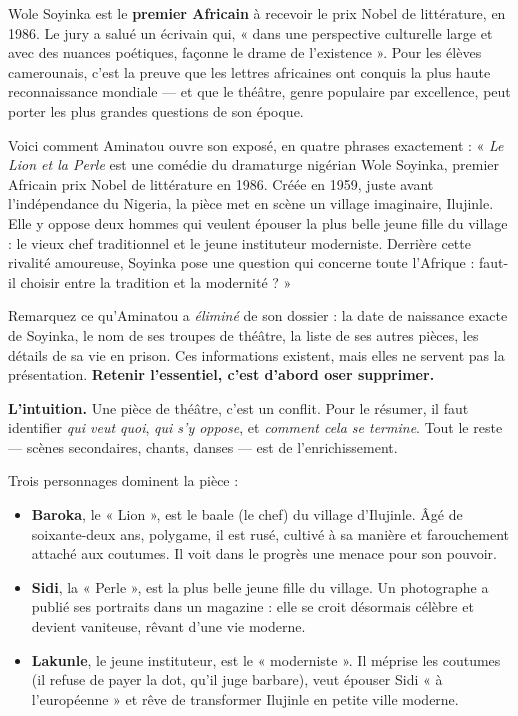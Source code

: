 \documentclass[11pt]{article}
\newcounter{popsec}
\newcounter{popsub}
\newcommand{\courssub}[1]{%
  \stepcounter{popsub}%
  \par\vspace{9pt}\noindent{\popxbold\fontsize{11.5}{13}\selectfont\color{popink}{\color{poporange}\thepopsec.\thepopsub}\hspace{6pt}#1}\par\nopagebreak\vspace{4pt}
}
\begin{document}
\begin{savaistu}
Wole Soyinka est le \textbf{premier Africain} à recevoir le prix Nobel de littérature, en 1986. Le jury a salué un écrivain qui, « dans une perspective culturelle large et avec des nuances poétiques, façonne le drame de l'existence ». Pour les élèves camerounais, c'est la preuve que les lettres africaines ont conquis la plus haute reconnaissance mondiale — et que le théâtre, genre populaire par excellence, peut porter les plus grandes questions de son époque.
\end{savaistu}

\begin{exemplebox}
Voici comment Aminatou ouvre son exposé, en quatre phrases exactement : « \emph{Le Lion et la Perle} est une comédie du dramaturge nigérian Wole Soyinka, premier Africain prix Nobel de littérature en 1986. Créée en 1959, juste avant l'indépendance du Nigeria, la pièce met en scène un village imaginaire, Ilujinle. Elle y oppose deux hommes qui veulent épouser la plus belle jeune fille du village : le vieux chef traditionnel et le jeune instituteur moderniste. Derrière cette rivalité amoureuse, Soyinka pose une question qui concerne toute l'Afrique : faut-il choisir entre la tradition et la modernité ? »
\end{exemplebox}

Remarquez ce qu'Aminatou a \emph{éliminé} de son dossier : la date de naissance exacte de Soyinka, le nom de ses troupes de théâtre, la liste de ses autres pièces, les détails de sa vie en prison. Ces informations existent, mais elles ne servent pas la présentation. \textbf{Retenir l'essentiel, c'est d'abord oser supprimer.}

\courssub{Exposé n° 3 : les personnages et le conflit central}

\textbf{L'intuition.} Une pièce de théâtre, c'est un conflit. Pour le résumer, il faut identifier \emph{qui veut quoi}, \emph{qui s'y oppose}, et \emph{comment cela se termine}. Tout le reste — scènes secondaires, chants, danses — est de l'enrichissement.

Trois personnages dominent la pièce :

\begin{itemize}
\item \textbf{Baroka}, le « Lion », est le baale (le chef) du village d'Ilujinle. Âgé de soixante-deux ans, polygame, il est rusé, cultivé à sa manière et farouchement attaché aux coutumes. Il voit dans le progrès une menace pour son pouvoir.
\item \textbf{Sidi}, la « Perle », est la plus belle jeune fille du village. Un photographe a publié ses portraits dans un magazine : elle se croit désormais célèbre et devient vaniteuse, rêvant d'une vie moderne.
\item \textbf{Lakunle}, le jeune instituteur, est le « moderniste ». Il méprise les coutumes (il refuse de payer la dot, qu'il juge barbare), veut épouser Sidi « à l'européenne » et rêve de transformer Ilujinle en petite ville moderne.
\end{itemize}
\end{document}
